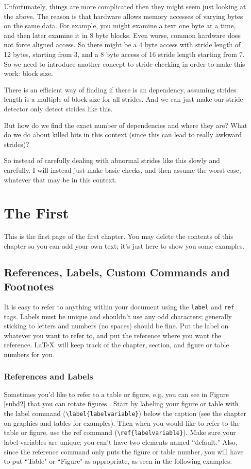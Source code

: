 \documentclass[12pt,twoside]{reedthesis}
\begin{document}
		Unfortunately, things are more complicated then they might seem just looking at the above. 
		The reason is that hardware allows memory accesses of varying bytes on the same data. For example, you might examine a text one byte at a time, and then later examine it in 8 byte blocks. Even worse, common hardware does not force aligned access. So there might be a 4 byte access with stride length of 12 bytes, starting from 3, and a 8 byte access of 16 stride length starting from 7. So we need to introduce another concept to stride checking in order to make this work: block size. 
		
		There is an efficient way of finding if there is an dependency, assuming strides length is a multiple of block size for all strides. And we can just make our stride detector only detect strides like this.
		
		But how do we find the exact number of dependencies and where they are? What do we do about killed bits in this context (since this can lead to really awkward strides)? 
		
		So instead of carefully dealing with abnormal strides like this slowly and carefully, I will instead just make basic checks, and then assume the worst case, whatever that may be in this context. 

\chapter{The First}
  	This is the first page of the first chapter. You may delete the contents of this chapter so you can add your own text; it's just here to show you some examples. 
	
	\section{References, Labels, Custom Commands and Footnotes}
	It is easy to refer to anything within your document using the \texttt{label} and \texttt{ref} tags.  Labels must be unique and shouldn't use any odd characters; generally sticking to letters and numbers (no spaces) should be fine. Put the label on whatever you want to refer to, and put the reference where you want the reference. \LaTeX\ will keep track of the chapter, section, and figure or table numbers for you. 
	
	\subsection{References and Labels}
	Sometimes you'd like to refer to a table or figure, e.g. you can see in Figure \ref{subd2} that you can rotate figures . Start by labeling your figure or table with the label command (\verb=\label{labelvariable}=) below the caption (see the chapter on graphics and tables for examples). Then when you would like to refer to the table or figure, use the ref command (\verb=\ref{labelvariable}=). Make sure your label variables are unique; you can't have two elements named ``default." Also, since the reference command only puts the figure or table number, you will have to put  ``Table" or ``Figure" as appropriate, as seen in the following examples:
	
\end{document}
